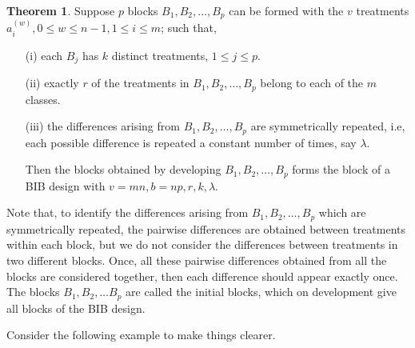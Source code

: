 \documentclass[12pt]{article}
\theoremstyle{definition}
\newtheorem{thm}{Theorem}
\newenvironment{theorem}{
\begin{tcolorbox}[colback=green!5!white,colframe=green!75!black, parbox = false]\begin{thm} }{\end{thm}\end{tcolorbox} }
\begin{document}
\begin{theorem}\label{thm:difference-1}
	Suppose $p$ blocks $B_1, B_2, \ldots, B_p$ can be formed with the $v$ treatments $a^{(w)}_{i}, 0 \leq w \leq n-1, 1 \leq i \leq m$; such that, 
		\begin{enumerate}
			\item[(i)] each $B_j$ has $k$ distinct treatments, $1 \leq j \leq p$. 
			\item[(ii)] exactly $r$ of the treatments in $B_1, B_2, \ldots, B_p$ belong to each of the $m$ classes.
			\item[(iii)] the differences arising from $B_1, B_2, \ldots, B_p$ are symmetrically repeated, i.e, each possible difference is repeated a constant number of times, say $\lambda$. \par 
			Then the blocks obtained by developing $B_1, B_2, \ldots, B_p$ forms the block of a BIB design with $v = mn, b = np, r, k, \lambda$.
		\end{enumerate}
\end{theorem}

Note that, to identify the differences arising from $B_1, B_2, \ldots, B_p$ which are symmetrically repeated, the pairwise differences are obtained between treatments within each block, but we do not consider the differences between treatments in two  different blocks. Once, all these pairwise differences obtained from all the blocks are considered together, then each difference should appear exactly once. The blocks $B_1, B_2, \dots B_p$ are called the initial blocks, which on development give all blocks of the BIB design.

Consider the following example to make things clearer.
\end{document}
